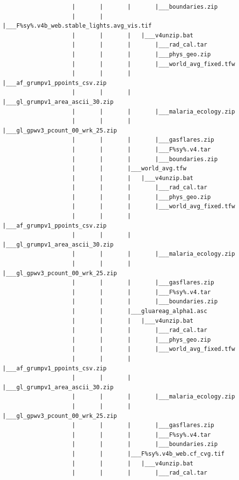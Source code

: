 \documentclass[
]{book}
\begin{document}
\begin{verbatim}
                    |       |       |       |___boundaries.zip
                    |       |       |___F%sy%.v4b_web.stable_lights.avg_vis.tif
                    |       |       |   |___v4unzip.bat
                    |       |       |       |___rad_cal.tar
                    |       |       |       |___phys_geo.zip
                    |       |       |       |___world_avg_fixed.tfw
                    |       |       |       |___af_grumpv1_ppoints_csv.zip
                    |       |       |       |___gl_grumpv1_area_ascii_30.zip
                    |       |       |       |___malaria_ecology.zip
                    |       |       |       |___gl_gpwv3_pcount_00_wrk_25.zip
                    |       |       |       |___gasflares.zip
                    |       |       |       |___F%sy%.v4.tar
                    |       |       |       |___boundaries.zip
                    |       |       |___world_avg.tfw
                    |       |       |   |___v4unzip.bat
                    |       |       |       |___rad_cal.tar
                    |       |       |       |___phys_geo.zip
                    |       |       |       |___world_avg_fixed.tfw
                    |       |       |       |___af_grumpv1_ppoints_csv.zip
                    |       |       |       |___gl_grumpv1_area_ascii_30.zip
                    |       |       |       |___malaria_ecology.zip
                    |       |       |       |___gl_gpwv3_pcount_00_wrk_25.zip
                    |       |       |       |___gasflares.zip
                    |       |       |       |___F%sy%.v4.tar
                    |       |       |       |___boundaries.zip
                    |       |       |___gluareag_alpha1.asc
                    |       |       |   |___v4unzip.bat
                    |       |       |       |___rad_cal.tar
                    |       |       |       |___phys_geo.zip
                    |       |       |       |___world_avg_fixed.tfw
                    |       |       |       |___af_grumpv1_ppoints_csv.zip
                    |       |       |       |___gl_grumpv1_area_ascii_30.zip
                    |       |       |       |___malaria_ecology.zip
                    |       |       |       |___gl_gpwv3_pcount_00_wrk_25.zip
                    |       |       |       |___gasflares.zip
                    |       |       |       |___F%sy%.v4.tar
                    |       |       |       |___boundaries.zip
                    |       |       |___F%sy%.v4b_web.cf_cvg.tif
                    |       |       |   |___v4unzip.bat
                    |       |       |       |___rad_cal.tar

\end{verbatim}
\end{document}

